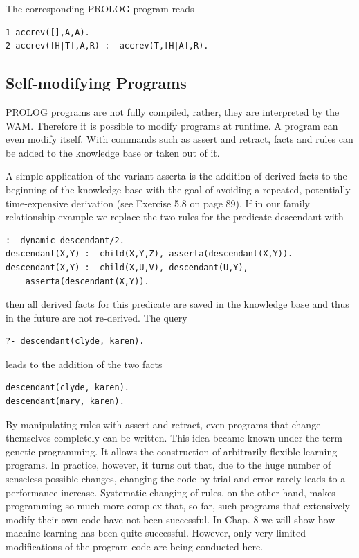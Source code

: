 \documentclass[10pt]{article}
\begin{document}
The corresponding PROLOG program reads

\begin{verbatim}
1 accrev([],A,A).
2 accrev([H|T],A,R) :- accrev(T,[H|A],R).
\end{verbatim}

\subsection*{Self-modifying Programs}
PROLOG programs are not fully compiled, rather, they are interpreted by the WAM. Therefore it is possible to modify programs at runtime. A program can even modify itself. With commands such as assert and retract, facts and rules can be added to the knowledge base or taken out of it.

A simple application of the variant asserta is the addition of derived facts to the beginning of the knowledge base with the goal of avoiding a repeated, potentially time-expensive derivation (see Exercise 5.8 on page 89). If in our family relationship example we replace the two rules for the predicate descendant with

\begin{verbatim}
:- dynamic descendant/2.
descendant(X,Y) :- child(X,Y,Z), asserta(descendant(X,Y)).
descendant(X,Y) :- child(X,U,V), descendant(U,Y),
    asserta(descendant(X,Y)).
\end{verbatim}

then all derived facts for this predicate are saved in the knowledge base and thus in the future are not re-derived. The query

\begin{verbatim}
?- descendant(clyde, karen).
\end{verbatim}

leads to the addition of the two facts

\begin{verbatim}
descendant(clyde, karen).
descendant(mary, karen).
\end{verbatim}

By manipulating rules with assert and retract, even programs that change themselves completely can be written. This idea became known under the term genetic programming. It allows the construction of arbitrarily flexible learning programs. In practice, however, it turns out that, due to the huge number of senseless possible changes, changing the code by trial and error rarely leads to a performance increase. Systematic changing of rules, on the other hand, makes programming so much more complex that, so far, such programs that extensively modify their own code have not been successful. In Chap. 8 we will show how machine learning has been quite successful. However, only very limited modifications of the program code are being conducted here.
\end{document}
